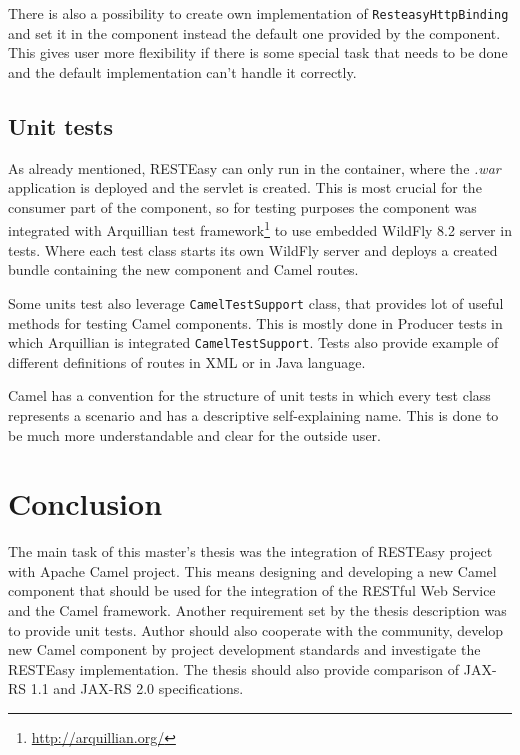 \documentclass[12pt,final,oneside]{fithesis2}
\begin{document}
There is also a possibility to create own implementation of \texttt{ResteasyHttpBinding} and set it in the component instead the default one provided by the component. This gives user more flexibility if there is some special task that needs to be done and the default implementation can't handle it correctly.  


\section{Unit tests}
As already mentioned, RESTEasy can only run in the container, where the \textit{.war} application is deployed and the servlet is created. This is most crucial for the consumer part of the component, so for testing purposes the component was integrated with Arquillian test framework\footnote{\url{http://arquillian.org/}} to use embedded WildFly 8.2 server in tests. Where each test class starts its own WildFly server and deploys a created bundle containing the new component and Camel routes.  

Some units test also leverage \texttt{CamelTestSupport} class, that provides lot of useful methods for testing Camel components. This is mostly done in Producer tests in which Arquillian is integrated \texttt{CamelTestSupport}. Tests also provide example of different definitions of routes in XML or in Java language.

Camel has a convention for the structure of unit tests in which every test class represents a scenario and has a descriptive self-explaining name. This is done to be much more understandable and clear for the outside user. 


\chapter{Conclusion}
The main task of this master's thesis was the integration of RESTEasy project with Apache Camel project. This means designing and developing a new Camel component that should be used for the integration of the RESTful Web Service and the Camel framework. Another requirement set by the thesis description was to provide unit tests. Author should also cooperate with the community, develop new Camel component by project development standards and investigate the RESTEasy implementation. The thesis should also provide comparison of JAX-RS 1.1 and JAX-RS 2.0 specifications.
\end{document}
